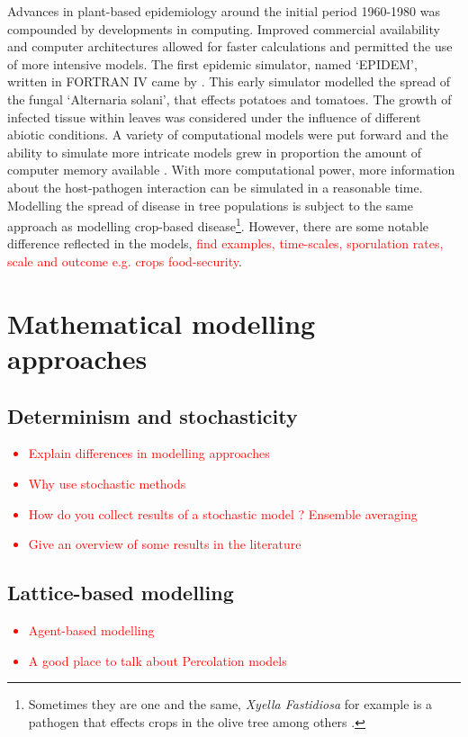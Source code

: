 Advances in plant-based epidemiology around the initial period 1960-1980 was compounded by developments in computing. Improved commercial availability and computer architectures allowed for faster calculations and permitted the use of more intensive models. The first epidemic simulator, named `EPIDEM', written in FORTRAN IV came by \cite{waggoner1969epidem}. This early simulator modelled the spread of the fungal `Alternaria solani', that effects potatoes and tomatoes. The growth of infected tissue within leaves was considered under the influence of different abiotic conditions. A variety of computational models were put forward \cite{doi:10.1146/annurev.py.23.090185.002031} and the ability to simulate more intricate models grew in proportion the amount of computer memory available \cite{zadoks1972methodology}. With more computational power, more information about the host-pathogen interaction can be simulated in a reasonable time.\\

Modelling the spread of disease in tree populations is subject to the same approach as modelling crop-based disease\footnote{Sometimes they are one and the same, \textit{Xyella Fastidiosa} for example is a pathogen that effects crops in the olive tree \cite{doi:10.1146/annurev-phyto-080417-045849} among others \cite{simpson2000genome}.}. However, there are some notable difference reflected in the models, \textcolor{red}{find examples, time-scales, sporulation rates, scale and outcome e.g. crops food-security}.

\section{Mathematical modelling approaches}

\subsection{Determinism and stochasticity}
\textcolor{red}{
\begin{itemize}
    \item Explain differences in modelling approaches
    \item Why use stochastic methods
    \item How do you collect results of a stochastic model ? Ensemble averaging
    \item Give an overview of some results in the literature
\end{itemize}}

\subsection{Lattice-based modelling}
\textcolor{red}{
\begin{itemize}
    \item Agent-based modelling
    \item A good place to talk about Percolation models
\end{itemize}}
\blindtext

